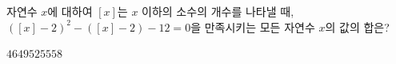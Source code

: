 자연수 $x$에 대하여 $[x]$는 $x$ 이하의 소수의 개수를 나타낼 때, $([x]-2)^2-([x]-2)-12=0$을 만족시키는 모든 자연수 $x$의 값의 합은?
\begin{choices32}{$46$}{$49$}{$52$}{$55$}{$58$}\end{choices32}
